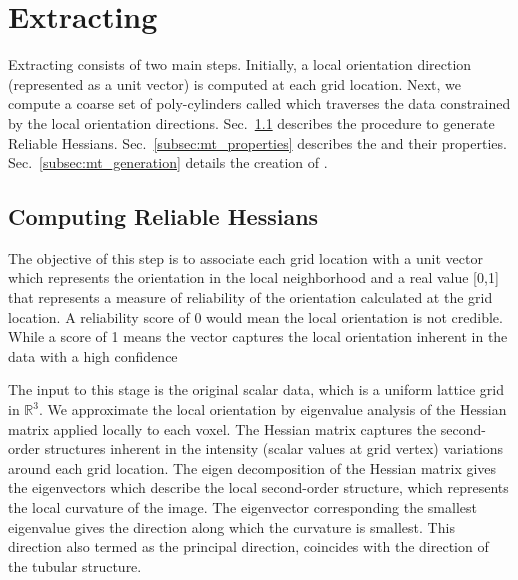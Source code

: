 \section{Extracting \mt}
Extracting \mt consists of two main steps. Initially, a local orientation direction (represented as a unit vector) is computed at each grid location.
Next, we compute a coarse set of poly-cylinders called \mt which traverses the data constrained by the local orientation directions. Sec.~\ref{subsec:reliable_hessian} describes the procedure to generate Reliable Hessians. Sec.~\ref{subsec:mt_properties}  describes the \mt and their properties. Sec.~\ref{subsec:mt_generation} details the creation of \mt.
\subsection{Computing Reliable Hessians}\label{subsec:reliable_hessian} 
The objective of this step is to associate each grid location with a unit vector which represents the orientation in the local neighborhood and a real value [0,1] that represents a measure of reliability of the orientation calculated at the grid location. A reliability score of 0 would mean the local orientation is not credible. While a score of 1 means the vector captures the local orientation inherent in the data with a high confidence

The input to this stage is the original scalar data, which is a uniform lattice grid in $\mathbb{R}^3$. We approximate the local orientation  by eigenvalue analysis of the Hessian matrix applied locally to each voxel.
The Hessian matrix captures the second-order structures inherent in the intensity (scalar values at grid vertex) variations around each grid location.
The eigen decomposition of the Hessian matrix gives the eigenvectors which describe the local second-order structure, which represents the local curvature of the image. The eigenvector corresponding the smallest eigenvalue gives the direction along which the curvature is smallest. This direction also termed as the principal direction, coincides with the direction of the tubular structure. 


